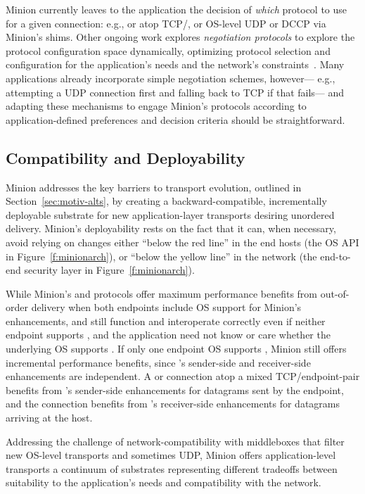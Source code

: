 Minion currently leaves to the application
the decision of {\em which} protocol to use for a given connection:
e.g., \ucobs or \utls atop TCP/\utcp,
or OS-level UDP or DCCP via Minion's shims.
Other ongoing work explores {\em negotiation protocols}
to explore the protocol configuration space dynamically,
optimizing protocol selection and configuration
for the application's needs and the network's 
constraints~\cite{ford09efficient}.
Many applications already incorporate simple negotiation schemes,
however---%
e.g., attempting a UDP connection first
and falling back to TCP if that fails---%
and adapting these mechanisms
to engage Minion's protocols according to
application-defined preferences and decision criteria
should be straightforward.

\subsection{Compatibility and Deployability}

Minion addresses the key barriers to transport evolution,
outlined in Section~\ref{sec:motiv-alts},
by creating a backward-compatible, incrementally deployable substrate
for new application-layer transports desiring unordered delivery.
Minion's deployability rests on the fact that it can,
when necessary,
avoid relying on changes either
``below the red line'' in the end hosts
(the OS API in Figure~\ref{f:minionarch}),
or
``below the yellow line'' in the network
(the end-to-end security layer in Figure~\ref{f:minionarch}).

While Minion's \ucobs and \utls protocols
offer maximum performance benefits from out-of-order delivery
when both endpoints include OS support for Minion's \utcp enhancements,
\ucobs and \utls still function and interoperate correctly
even if neither endpoint supports \utcp,
and the application need not know or care
whether the underlying OS supports \utcp.
If only one endpoint OS supports \utcp,
Minion still offers incremental performance benefits,
since \utcp's sender-side and receiver-side enhancements are independent.
A \ucobs or \utls connection atop a mixed TCP/\linebreak[0]\utcp endpoint-pair
benefits from \utcp's sender-side enhancements
for datagrams sent by the \utcp endpoint,
and the connection benefits from \utcp's receiver-side enhancements
for datagrams arriving at the \utcp host.

Addressing the challenge of network-compatibility
with middleboxes that filter new OS-level transports
and sometimes UDP,
Minion offers application-level transports
a continuum of substrates
representing different tradeoffs
between suitability to the application's needs
and compatibility with the network.

